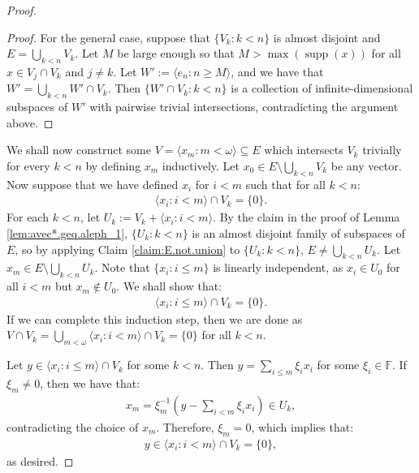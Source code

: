 \documentclass[11pt,reqno]{amsart}
\theoremstyle{plain}
\numberwithin{equation}{section}
\theoremstyle{definition}
\newcommand{\func}{\operatorname}
\renewcommand{\c}[1]{\langle #1 \rangle}
\newcommand{\bb}[1]{\left( #1 \right)}
\newcommand{\supp}{\func{supp}}
\newenvironment{midproof}[1][Proof]
  {\begin{proof}[#1]\renewcommand{\qedsymbol}{$\blacksquare$}}
  {\end{proof}}
\begin{document}
\begin{proof}
\begin{midproof}
        For the general case, suppose that $\{V_k : k < n\}$ is almost disjoint and $E = \bigcup_{k<n} V_k$. Let $M$ be large enough so that $M > \max(\supp(x))$ for all $x \in V_j \cap V_k$ and $j \neq k$. Let $W' := \c{e_n : n \geq M}$, and we have that $W' = \bigcup_{k<n} W' \cap V_k$. Then $\{W' \cap V_k : k < n\}$ is a collection of infinite-dimensional subspaces of $W'$ with pairwise trivial intersections, contradicting the argument above.
    \end{midproof}

    We shall now construct some $V = \c{x_m : m < \omega} \subseteq E$ which intersects $V_k$ trivially for every $k < n$ by defining $x_m$ inductively. Let $x_0 \in E \setminus \bigcup_{k<n} V_k$ be any vector. Now suppose that we have defined $x_i$ for $i < m$ such that for all $k < n$:
    \begin{align*}
        \c{x_i : i < m} \cap V_k = \{0\}.
    \end{align*}
    For each $k < n$, let $U_k := V_k + \c{x_i : i < m}$. By the claim in the proof of Lemma \ref{lem:avec*.geq.aleph_1}, $\{U_k : k < n\}$ is an almost disjoint family of subspaces of $E$, so by applying Claim \ref{claim:E.not.union} to $\{U_k : k < n\}$, $E \neq \bigcup_{k<n} U_k$. Let $x_m \in E \setminus \bigcup_{k<n} U_k$. Note that $\{x_i : i \leq m\}$ is linearly independent, as $x_i \in U_0$ for all $i < m$ but $x_m \notin U_0$. We shall show that:
    \begin{align*}
        \c{x_i : i \leq m} \cap V_k = \{0\}.
    \end{align*}
    If we can complete this induction step, then we are done as $V \cap V_k = \bigcup_{m<\omega} \c{x_i : i < m} \cap V_k = \{0\}$ for all $k < n$.
    
    Let $y \in \c{x_i : i \leq m} \cap V_k$ for some $k < n$. Then $y = \sum_{i \leq m} \xi_i x_i$ for some $\xi_i \in \mathbb{F}$. If $\xi_m \neq 0$, then we have that:
    \begin{align*}
        x_m = \xi_m^{-1}\bb{y - \sum_{i<m} \xi_i x_i} \in U_k,
    \end{align*}
    contradicting the choice of $x_m$. Therefore, $\xi_m = 0$, which implies that:
    \begin{align*}
        y \in \c{x_i : i < m} \cap V_k = \{0\},
    \end{align*}
    as desired. 
\end{proof}
\end{document}
